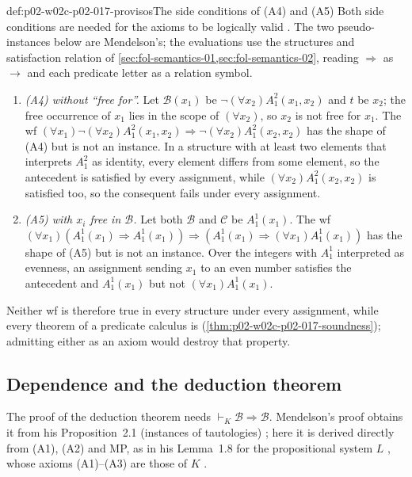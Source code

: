 \begin{hbwarning}{def:p02-w02c-p02-017-provisos}{The side conditions of (A4) and (A5)}
Both side conditions are needed for the axioms to be logically valid
\cite[\S 2.3, pp.~70--71]{Mendelson1997}.  The two pseudo-instances below
are Mendelson's; the evaluations use the structures and satisfaction
relation of \cref{sec:fol-semantics-01,sec:fol-semantics-02}, reading
\(\Rightarrow\) as \(\to\) and each predicate letter as a relation symbol.
\begin{enumerate}
  \item \emph{(A4) without ``free for''.}  Let \(\mathscr B(x_1)\) be
        \(\neg(\forall x_2)A^2_1(x_1,x_2)\) and \(t\) be \(x_2\); the free
        occurrence of \(x_1\) lies in the scope of \((\forall x_2)\), so
        \(x_2\) is not free for \(x_1\).  The wf
        \((\forall x_1)\neg(\forall x_2)A^2_1(x_1,x_2)\Rightarrow
        \neg(\forall x_2)A^2_1(x_2,x_2)\) has the shape of (A4) but is not an
        instance.  In a structure with at least two elements that interprets
        \(A^2_1\) as identity, every element differs from some element, so
        the antecedent is satisfied by every assignment, while
        \((\forall x_2)A^2_1(x_2,x_2)\) is satisfied too, so the consequent
        fails under every assignment.
  \item \emph{(A5) with \(x_i\) free in \(\mathscr B\).}  Let both
        \(\mathscr B\) and \(\mathscr C\) be \(A^1_1(x_1)\).  The wf
        \((\forall x_1)(A^1_1(x_1)\Rightarrow A^1_1(x_1))\Rightarrow
        (A^1_1(x_1)\Rightarrow(\forall x_1)A^1_1(x_1))\) has the shape of
        (A5) but is not an instance.  Over the integers with \(A^1_1\)
        interpreted as evenness, an assignment sending \(x_1\) to an even
        number satisfies the antecedent and \(A^1_1(x_1)\) but not
        \((\forall x_1)A^1_1(x_1)\).
\end{enumerate}
Neither wf is therefore true in every structure under every assignment, while
every theorem of a predicate calculus is
(\cref{thm:p02-w02c-p02-017-soundness}); admitting either as an axiom would
destroy that property.
\end{hbwarning}

\subsection{Dependence and the deduction theorem}
\label{sec:p02-w02c-p02-017-deduction}

The proof of the deduction theorem needs \(\vdash_K\mathscr B\Rightarrow
\mathscr B\).  Mendelson's proof obtains it from his
Proposition~2.1 (instances of tautologies) \cite[\S 2.4, p.~74]{Mendelson1997};
here it is derived directly from (A1), (A2) and MP, as in his Lemma~1.8 for
the propositional system \(L\) \cite[\S 1.4, p.~36]{Mendelson1997}, whose
axioms (A1)--(A3) are those of \(K\) \cite[\S 1.4, p.~35]{Mendelson1997}.

